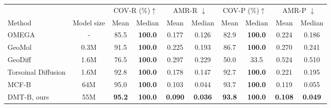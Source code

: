 \begin{tabular}{lccccccccc}\toprule
    & \multicolumn{1}{l}{} & \multicolumn{2}{c}{COV-R  (\%)$\uparrow$} & \multicolumn{2}{c}{AMR-R $\downarrow$} & \multicolumn{2}{c}{COV-P (\%)$\uparrow$} & \multicolumn{2}{c}{AMR-P $\downarrow$} \\\cmidrule(lr){3-4} \cmidrule(lr){5-6}  \cmidrule(lr){7-8} \cmidrule(lr){9-10}
    Method & Model size           & Mean          & Median         & Mean        & Median        & Mean          & Median         & Mean        & Median        \\\midrule
OMEGA       & -                             & 85.5                   & \textbf{100.0}          & 0.177                & 0.126                  & 82.9                   & \textbf{100.0}          & 0.224                & 0.186                  \\
GeoMol      & 0.3M                          & 91.5                   & \textbf{100.0}          & 0.225                & 0.193                  & 86.7                   & \textbf{100.0}          & 0.270                & 0.241                  \\
GeoDiff     & 1.6M                          & 76.5                   & \textbf{100.0}          & 0.297                & 0.229                  & 50.0                   & 33.5                    & 0.524                & 0.510                  \\
Torsoinal Diffusion  & 1.6M                          & 92.8                   & \textbf{100.0}          & 0.178                & 0.147                  & 92.7                   & \textbf{100.0}          & 0.221                & 0.195                  \\
MCF-B         & 64M                           & 95.0                   & \textbf{100.0}          & 0.103                & 0.044                  & 93.7                   & \textbf{100.0}          & 0.119                & 0.055                  \\
DMT-B, ours & 55M                           & \textbf{95.2}             & \textbf{100.0}          & \textbf{0.090}          & \textbf{0.036}         & \textbf{93.8}             & \textbf{100.0}          & \textbf{0.108}          & \textbf{0.049}           \\\bottomrule
\end{tabular}